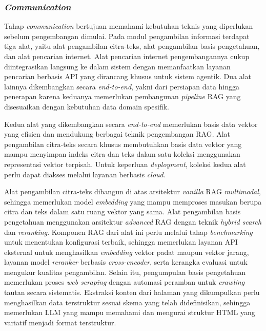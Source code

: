 \subsubsection{\textit{Communication}}
Tahap \textit{communication} bertujuan memahami kebutuhan teknis yang diperlukan sebelum pengembangan dimulai. Pada modul pengambilan informasi terdapat tiga alat, yaitu alat pengambilan citra-teks, alat pengambilan basis pengetahuan, dan alat pencarian internet. Alat pencarian internet pengembangannya cukup diintegrasikan langsung ke dalam sistem dengan memanfaatkan layanan pencarian berbasis API yang dirancang khusus untuk sistem agentik. Dua alat lainnya dikembangkan secara \textit{end-to-end}, yakni dari persiapan data hingga penerapan karena keduanya memerlukan pembangunan \textit{pipeline} RAG yang disesuaikan dengan kebutuhan data domain spesifik.

Kedua alat yang dikembangkan secara \textit{end-to-end} memerlukan basis data vektor yang efisien dan mendukung berbagai teknik pengembangan RAG. Alat pengambilan citra-teks secara khusus membutuhkan basis data vektor yang mampu menyimpan indeks citra dan teks dalam satu koleksi menggunakan representasi vektor terpisah. Untuk keperluan \textit{deployment}, koleksi kedua alat perlu dapat diakses melalui layanan berbasis \textit{cloud}.

Alat pengambilan citra-teks dibangun di atas arsitektur \textit{vanilla} RAG \textit{multimodal}, sehingga memerlukan model \textit{embedding} yang mampu memproses masukan berupa citra dan teks dalam satu ruang vektor yang sama. Alat pengambilan basis pengetahuan menggunakan arsitektur \textit{advanced} RAG dengan teknik \textit{hybrid search} dan \textit{reranking}. Komponen RAG dari alat ini perlu melalui tahap \textit{benchmarking} untuk menentukan konfigurasi terbaik, sehingga memerlukan layanan API eksternal untuk menghasilkan \textit{embedding} vektor padat maupun vektor jarang, layanan model \textit{reranker} berbasis \textit{cross-encoder}, serta kerangka evaluasi untuk mengukur kualitas pengambilan. Selain itu, pengumpulan basis pengetahuan memerlukan proses \textit{web scraping} dengan automasi peramban untuk \textit{crawling} tautan secara sistematis. Ekstraksi konten dari halaman yang dikumpulkan perlu menghasilkan data terstruktur sesuai skema yang telah didefinisikan, sehingga memerlukan LLM yang mampu memahami dan mengurai struktur HTML yang variatif menjadi format terstruktur.

